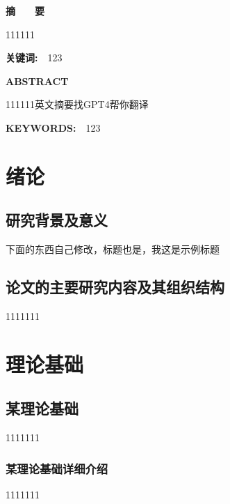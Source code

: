 \documentclass[UTF8,a4paper,12pt]{ctexart}
\begin{document}
	\begin{spacing}{1.4}
	\tableofcontents
	
	\end{spacing}
	\thispagestyle{fancy}
	\fancyfoot{}
	\newpage
	\fancyfoot[C]{\thepage} 
	 
	\centerline{\textbf{\fontsize{16pt}{\baselineskip}\heiti 摘　　要}}
	\vspace{0.4cm}
	111111
	\vspace{0.2cm}
	\par \textbf{\fontsize{14pt}{\baselineskip}\heiti 关键词:　}123
	\setcounter{page}{1}
	\newpage
	\centerline{\textbf{\fontsize{16pt}{\baselineskip}ABSTRACT}}
	\vspace{0.4cm}
	111111英文摘要找GPT4帮你翻译
	\vspace{0.4cm}
	\par \textbf{\fontsize{14pt}{\baselineskip}KEYWORDS:　}123
	\newpage
	\setcounter{page}{1}
	\section{\fontsize{16pt}{\baselineskip}\heiti 绪论}
	\subsection{\fontsize{14pt}{\baselineskip}\heiti 研究背景及意义}
	下面的东西自己修改，标题也是，我这是示例标题
	
	\subsection{\fontsize{14pt}{\baselineskip}\heiti 论文的主要研究内容及其组织结构}
	1111111
	
	\section{\fontsize{16pt}{\baselineskip}\heiti 理论基础}
	
	\subsection{\fontsize{14pt}{\baselineskip}\heiti 某理论基础}
	1111111
	
	\subsubsection{\fontsize{13pt}{\baselineskip}\heiti 某理论基础详细介绍}
	1111111
	
\end{document}
